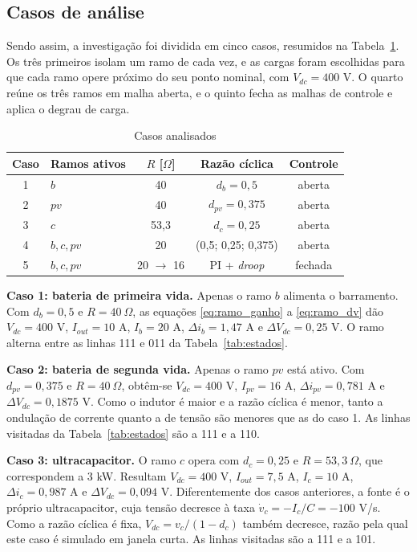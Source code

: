\subsection{Casos de análise}

Sendo assim, a investigação foi dividida em cinco casos, resumidos na Tabela~\ref{tab:casos}. Os três primeiros isolam um ramo de cada vez, e as cargas foram escolhidas para que cada ramo opere próximo do seu ponto nominal, com $V_{dc}=400$ V. O quarto reúne os três ramos em malha aberta, e o quinto fecha as malhas de controle e aplica o degrau de carga.

\begin{table}[H]
\centering
\caption{Casos analisados}
\label{tab:casos}
\footnotesize
\setlength{\tabcolsep}{3pt}
\begin{tabular}{clccc}
\toprule
Caso & Ramos ativos & $R$ [$\Omega$] & Razão cíclica & Controle \\
\midrule
1 & $b$ & 40 & $d_b=0{,}5$ & aberta \\
2 & $pv$ & 40 & $d_{pv}=0{,}375$ & aberta \\
3 & $c$ & 53,3 & $d_c=0{,}25$ & aberta \\
4 & $b,c,pv$ & 20 & (0,5; 0,25; 0,375) & aberta \\
5 & $b,c,pv$ & 20 $\to$ 16 & PI + \textit{droop} & fechada \\
\bottomrule
\end{tabular}
\end{table}

\textbf{Caso 1: bateria de primeira vida.} Apenas o ramo $b$ alimenta o barramento. Com $d_b=0{,}5$ e $R=40\ \Omega$, as equações \eqref{eq:ramo_ganho} a \eqref{eq:ramo_dv} dão $V_{dc}=400$ V, $I_{out}=10$ A, $I_b=20$ A, $\Delta i_b=1{,}47$ A e $\Delta V_{dc}=0{,}25$ V. O ramo alterna entre as linhas 111 e 011 da Tabela~\ref{tab:estados}.

\textbf{Caso 2: bateria de segunda vida.} Apenas o ramo $pv$ está ativo. Com $d_{pv}=0{,}375$ e $R=40\ \Omega$, obtêm-se $V_{dc}=400$ V, $I_{pv}=16$ A, $\Delta i_{pv}=0{,}781$ A e $\Delta V_{dc}=0{,}1875$ V. Como o indutor é maior e a razão cíclica é menor, tanto a ondulação de corrente quanto a de tensão são menores que as do caso 1. As linhas visitadas da Tabela~\ref{tab:estados} são a 111 e a 110.

\textbf{Caso 3: ultracapacitor.} O ramo $c$ opera com $d_c=0{,}25$ e $R=53{,}3\ \Omega$, que correspondem a 3 kW. Resultam $V_{dc}=400$ V, $I_{out}=7{,}5$ A, $I_c=10$ A, $\Delta i_c=0{,}987$ A e $\Delta V_{dc}=0{,}094$ V. Diferentemente dos casos anteriores, a fonte é o próprio ultracapacitor, cuja tensão decresce à taxa $\dot v_c=-I_c/C=-100$ V/s. Como a razão cíclica é fixa, $V_{dc}=v_c/(1-d_c)$ também decresce, razão pela qual este caso é simulado em janela curta. As linhas visitadas são a 111 e a 101.

